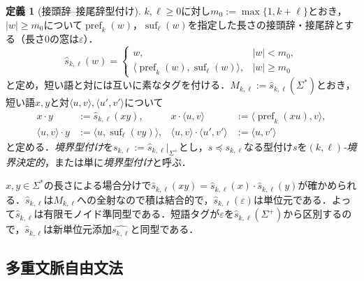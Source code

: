 \documentclass[11pt,a4paper]{ltjsarticle}
\numberwithin{equation}{section}
\theoremstyle{plain}
\theoremstyle{definition}
\newtheorem{definition}[theorem]{定義}
\theoremstyle{remark}
\newcommand{\eps}{\varepsilon}
\begin{document}
\begin{definition}[接頭辞--接尾辞型付け]
\label{def:prefix-suffix-typing}
$k,\ell\ge0$に対し$m_0:=\max\{1,k+\ell\}$とおき，$|w|\ge m_0$について$\operatorname{pref}_k(w)$，$\operatorname{suf}_\ell(w)$を指定した長さの接頭辞・接尾辞とする（長さ0の窓は$\eps$）．
\[
 \widehat{s}_{k,\ell}(w)=
 \begin{cases}
   w, & |w|<m_0,\\
   \langle\operatorname{pref}_k(w),\operatorname{suf}_\ell(w)\rangle,
      & |w|\ge m_0
 \end{cases}
\]
と定め，短い語と対には互いに素なタグを付ける．$M_{k,\ell}:=\widehat{s}_{k,\ell}(\Sigma^*)$とおき，短い語$x,y$と対$\langle u,v\rangle,\langle u',v'\rangle$について
\[
\begin{aligned}
 x\cdot y&:=\widehat{s}_{k,\ell}(xy), &
 x\cdot\langle u,v\rangle&:=\langle\operatorname{pref}_k(xu),v\rangle,\\
 \langle u,v\rangle\cdot y&:=\langle u,\operatorname{suf}_\ell(vy)\rangle, &
 \langle u,v\rangle\cdot\langle u',v'\rangle&:=\langle u,v'\rangle
\end{aligned}
\]
と定める．\emph{境界型付け}を$s_{k,\ell}:=\widehat{s}_{k,\ell}|_{\Sigma^+}$とし，$s\preceq s_{k,\ell}$なる型付け$s$を\emph{$(k,\ell)$-境界決定的}，または単に\emph{境界型付け}と呼ぶ．
\end{definition}

$x,y\in\Sigma^*$の長さによる場合分けで$\widehat{s}_{k,\ell}(xy)=\widehat{s}_{k,\ell}(x)\cdot\widehat{s}_{k,\ell}(y)$が確かめられる．$\widehat{s}_{k,\ell}$は$M_{k,\ell}$への全射なので積は結合的で，$\widehat{s}_{k,\ell}(\eps)$は単位元である．よって$\widehat{s}_{k,\ell}$は有限モノイド準同型である．短語タグが$\eps$を$\widehat{s}_{k,\ell}(\Sigma^+)$から区別するので，$\widehat{s}_{k,\ell}$は新単位元添加$\widehat{s_{k,\ell}}$と同型である．

\subsection{多重文脈自由文法}
\end{document}
